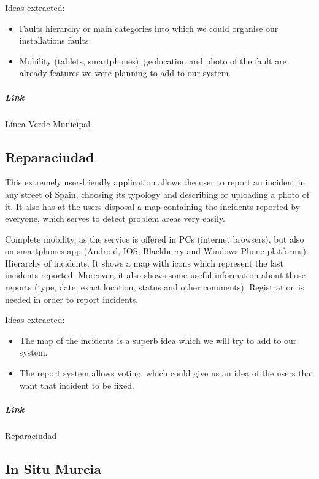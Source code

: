 Ideas extracted:

\begin{itemize}
\item Faults hierarchy or main categories into which we could organise our installations faults.
\item Mobility (tablets, smartphones), geolocation and photo of the fault are already features we were planning to add to our system.
\end{itemize}

\subparagraph{Link} \href{http://www.lineaverdemunicipal.com/Default.aspx}{Línea Verde Municipal}

\subsection{Reparaciudad}

This extremely user-friendly application allows the user to report an incident in any street of Spain, choosing its typology and describing or uploading a photo of it. It also has at the users disposal a map containing the incidents reported by everyone, which serves to detect problem areas very easily.

\begin{itemize}
\adv Complete mobility, as the service is offered in PCs (internet browsers), but also on smartphones app (Android, IOS, Blackberry and Windows Phone platforms).
\adv Hierarchy of incidents.
\adv It shows a map with icons which represent the last incidents reported. Moreover, it also shows some useful information about those reports (type, date, exact location, status and other comments).
\dsv Registration is needed in order to report incidents.
\end{itemize}

Ideas extracted:

\begin{itemize}
\item The map of the incidents is a superb idea which we will try to add to our system.
\item The report system allows voting, which could give us an idea of the users that want that incident to be fixed.
\end{itemize}

\subparagraph{Link} \href{http://reparaciudad.com}{Reparaciudad}

\subsection{In Situ Murcia}

